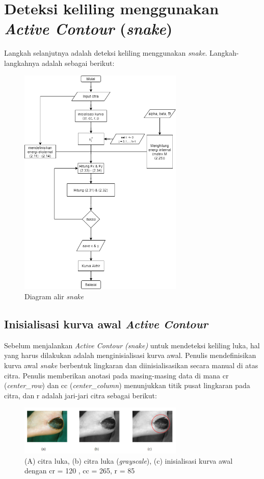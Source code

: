 \section{Deteksi keliling menggunakan \emph{Active Contour} (\emph{snake})}
Langkah selanjutnya adalah deteksi keliling menggunakan \emph{snake}. Langkah-langkahnya adalah sebagai berikut:
\begin{figure}[H]
	\centering
	\includegraphics[width=0.7\textwidth]{diagram/active_contour}
	\caption{Diagram alir \emph{snake}}
	\label{Gambar:flowsnake}
\end{figure}

\subsection{Inisialisasi kurva awal \emph{Active Contour}}
Sebelum menjalankan \emph{Active Contour (snake)} untuk mendeteksi keliling luka, hal yang harus dilakukan adalah menginisialisasi kurva awal. Penulis mendefinisikan kurva awal \emph{snake} berbentuk lingkaran dan diinisialisasikan secara manual di atas citra. Penulis memberikan anotasi pada masing-masing data di mana cr (\emph{center\_row}) dan cc (\emph{center\_column}) menunjukkan titik pusat lingkaran pada citra, dan r adalah jari-jari citra sebagai berikut:
\begin{figure}[H]
	\centering
	\includegraphics[width=0.7\textwidth]{gambar/snake_init_describe}
	\caption{(A) citra luka, (b) citra luka (\emph{grayscale}), (c) inisialisasi kurva awal dengan cr = 120 , cc = 265, r = 85}
	\label{Gambar:snake_init_describe}
\end{figure}



